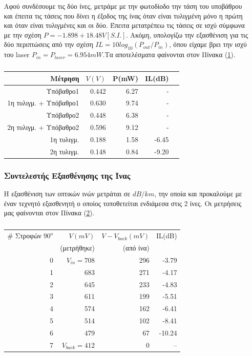 \documentclass[a4paper]{article}
\begin{document}
		Αφού συνδέσουμε τις δύο ίνες, μετράμε με την φωτοδίοδο την τάση του υποβάθρου και έπειτα τις τάσεις που δίνει η έξοδος της ίνας όταν είναι τυλιγμένη μόνο η πρώτη και όταν είναι τυλιγμένες και οι δύο. Έπειτα μετατρέπεω τις τάσεις σε ισχύ σύμφωνα με την σχέση $P=-1.898+18.48V [S.I.]$. Ακόμη, υπολογίζω την εξασθένιση για τις δύο περιπτώσεις από την σχέση $IL=10log_{10}(P_{out}/P_{in})$, όπου είχαμε βρει την ισχύ του laser $P_{in}=P_{laser}=6.954mW$.Τα αποτελέσματα φαίνονται στον Πίνακα (\ref{mat3}).
		
		\begin{table}[h!]
			\centering 
			\begin{tabular}{|r|r|r|r|r|}
				\hline 
				Μέτρηση  			   & $V(V)$& P(mW) & IL(dB) \\ \hline\hline 
				Υπόβαθρο1			   & 0.442 & 6.27 & -  \\ \hline
				1η τυλιγμ. + Υπόβαθρο1 & 0.630 & 9.74 & -  \\ \hline
				Υπόβαθρο2              & 0.448 & 6.38 & -  \\ \hline
				2η τυλιγμ. + Υπόβαθρο2 & 0.596 & 9.12 & -  \\ \hline	
				\hline \hline 
				1η τυλιγμ.             & 0.188 & 1.58 & -6.45\\ \hline 
				2η τυλιγμ.             & 0.148 & 0.84 & -9.20\\ \hline
			\end{tabular}
			\caption{ }
			\label{mat3}
		\end{table}
		
	\subsubsection*{Συντελεστής Εξασθένησης της Ίνας}
		Η εξασθένιση των οπτικών ινών μετράται σε $dB/km$, την οποία και προκαλούμε με έναν τεχνητό εξασθενητή ο οποίος τοποθετείται ενδιάμεσα στις 2 ίνες. Οι μετρήσεις μας φαίνονται στον Πίνακα (\ref{mat4}).
		\begin{table}[h!]
			\centering
			\begin{tabular}{|r|r|r|r|}
				\hline
				$\#$ Στροφών $90^o$ & $V(mV)$     & $V-V_{back}(mV)$    & IL(dB) \\ 
				                  & (μετρήθηκε) & (από ίνα)  &        \\
				 \hline\hline 
				0 & $V_{in}=708$   & 296 &  -3.79 \\\hline
				1 & 683  		   & 271 &  -4.17 \\\hline
				2 & 645  		   & 233 &  -4.83 \\\hline
				3 & 611  		   & 199 &  -5.51 \\\hline
				4 & 574 		   & 162 &  -6.41 \\\hline
				5 & 514 		   & 102 &  -8.41 \\\hline
				6 & 479 	   	   & 67  &  -10.24\\\hline
				7 & $V_{back}=412$ & 0   &  --  \\\hline
			\end{tabular}
			\caption{ }
			\label{mat4}
		\end{table}
	
\end{document}
